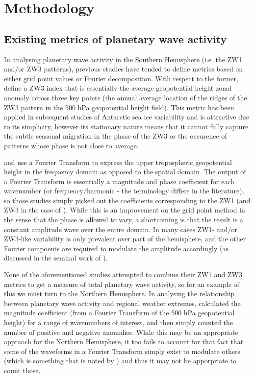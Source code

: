 \section{Methodology}\label{s:methodology}

\subsection{Existing metrics of planetary wave activity}\label{s:existing_metrics}

In analysing planetary wave activity in the Southern Hemisphere (i.e. the ZW1 and/or ZW3 patterns), previous studies have tended to define metrics based on either grid point values or Fourier decomposition. With respect to the former, \citet{Raphael2004} define a ZW3 index that is essentially the average geopotential height zonal anomaly across three key points (the annual average location of the ridges of the ZW3 pattern in the 500 hPa geopotential height field). This metric has been applied in subsequent studies of Antarctic sea ice variability \citep{Raphael2007,Raphael2014} and is attractive due to its simplicity, however its stationary nature means that it cannot fully capture the subtle \citep[but not insignificant at around 15 degrees of longitude on average;][]{Raphael2004} seasonal migration in the phase of the ZW3 or the occurence of patterns whose phase is not close to average.

\citet{Hobbs2007} and \citet{Hobbs2010} use a Fourier Transform to express the upper tropospheric geopotential height in the frequency domain as opposed to the spatial domain. The output of a Fourier Transform is essentially a magnitude and phase coefficient for each wavenumber (or frequency/harmonic - the terminology differs in the literature), so those studies simply picked out the coefficients corresponding to the ZW1 (and ZW3 in the case of \citet{Hobbs2010}). While this is an improvement on the grid point method in the sense that the phase is allowed to vary, a shortcoming is that the result is a constant amplitude wave over the entire domain. In many cases ZW1- and/or ZW3-like variability is only prevalent over part of the hemisphere, and the other Fourier compoents are required to modulate the amplitude accordingly (as discussed in the seminal work of \citet{vanLoon1972}).

None of the aforementioned studies attempted to combine their ZW1 and ZW3 metrics to get a measure of total planetary wave activity, so for an example of this we must turn to the Northern Hemisphere. In analysing the relationship between planetary wave activity and regional weather extremes, \citet{Screen2014} calculated the magnitude coefficient (from a Fourier Transform of the 500 hPa geopotential height) for a range of wavenumbers of interest, and then simply counted the number of positive and negative anomalies. While this may be an appropriate appraoch for the Northern Hemisphere, it too fails to account for that fact that some of the waveforms in a Fourier Transform simply exist to modulate others (which is something that is noted by \citet{Screen2014}) and thus it may not be apporpriate to count those.  